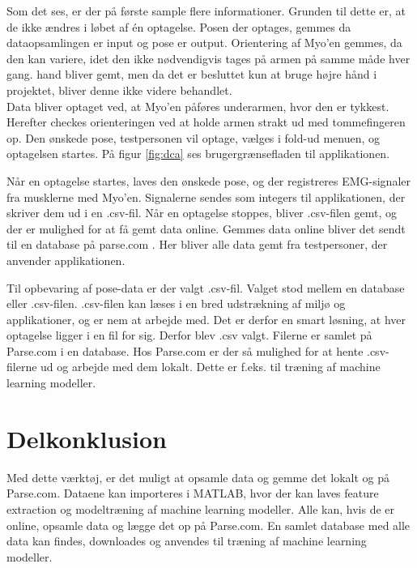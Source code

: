 Som det ses, er der på første sample flere informationer. Grunden til dette er, at de ikke ændres i løbet af én optagelse. Posen der optages, gemmes da dataopsamlingen er input og pose er output. Orientering af Myo'en gemmes, da den kan variere, idet den ikke nødvendigvis tages på armen på samme måde hver gang. hand bliver gemt, men da det er besluttet kun at bruge højre hånd i projektet, bliver denne ikke videre behandlet.\\
Data bliver optaget ved, at Myo'en påføres underarmen, hvor den er tykkest. Herefter checkes orienteringen ved at holde armen strakt ud med tommefingeren op. Den ønskede pose, testpersonen vil optage, vælges i fold-ud menuen, og optagelsen startes. På figur \ref{fig:dca} ses brugergrænsefladen til applikationen.


Når en optagelse startes, laves den ønskede pose, og der registreres EMG-signaler fra musklerne med Myo'en. Signalerne sendes som integers til applikationen, der skriver dem ud i en .csv-fil. Når en optagelse stoppes, bliver .csv-filen gemt, og der er mulighed for at få gemt data online. Gemmes data online bliver det sendt til en database på parse.com \citep{RefWorks:11}. Her bliver alle data gemt fra testpersoner, der anvender applikationen.

Til opbevaring af pose-data er der valgt .csv-fil. Valget stod mellem en database eller .csv-filen. .csv-filen kan læses i en bred udstrækning af miljø og applikationer, og er nem at arbejde med. Det er derfor en smart løsning, at hver optagelse ligger i en fil for sig. Derfor blev .csv valgt. Filerne er samlet på Parse.com i en database. Hos Parse.com er der så mulighed for at hente .csv-filerne ud og arbejde med dem lokalt. Dette er f.eks. til træning af machine learning modeller.

\section{Delkonklusion}
Med dette værktøj, er det muligt at opsamle data og gemme det lokalt og på Parse.com. Dataene kan importeres i MATLAB, hvor der kan laves feature extraction og modeltræning af machine learning modeller. Alle kan, hvis de er online, opsamle data og lægge det op på Parse.com. En samlet database med alle data kan findes, downloades og anvendes til træning af machine learning modeller.